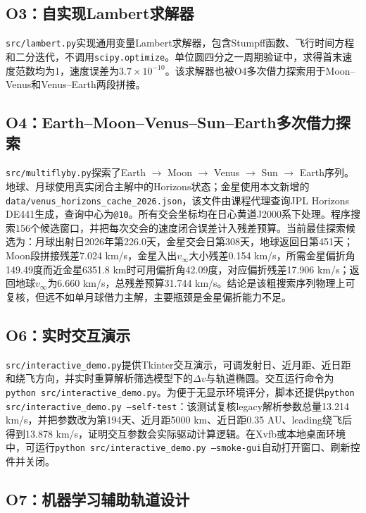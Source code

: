 \documentclass[11pt,a4paper]{ctexart}
\begin{document}
\subsection*{O3：自实现Lambert求解器}

\texttt{src/lambert.py}实现通用变量Lambert求解器，包含Stumpff函数、飞行时间方程和二分迭代，不调用\texttt{scipy.optimize}。单位圆四分之一周期验证中，求得首末速度范数均为1，速度误差为$3.7\times10^{-10}$。该求解器也被O4多次借力探索用于Moon--Venus和Venus--Earth两段拼接。

\subsection*{O4：Earth--Moon--Venus--Sun--Earth多次借力探索}

\texttt{src/multiflyby.py}探索了Earth $\to$ Moon $\to$ Venus $\to$ Sun $\to$ Earth序列。地球、月球使用真实闭合主解中的Horizons状态；金星使用本文新增的\texttt{data/venus\_horizons\_cache\_2026.json}，该文件由课程代理查询JPL Horizons DE441生成，查询中心为\texttt{@10}。所有交会坐标均在日心黄道J2000系下处理。程序搜索156个候选窗口，并把每次交会的速度闭合误差计入残差预算。当前最佳探索候选为：月球出射日2026年第226.0天，金星交会日第308天，地球返回日第451天；Moon段拼接残差7.024 km/s，金星入出$v_\infty$大小残差0.154 km/s，所需金星偏折角149.49度而近金星6351.8 km时可用偏折角42.09度，对应偏折残差17.906 km/s；返回地球$v_\infty$为6.660 km/s，总残差预算31.744 km/s。结论是该粗搜索序列物理上可复核，但远不如单月球借力主解，主要瓶颈是金星偏折能力不足。

\subsection*{O6：实时交互演示}

\texttt{src/interactive\_demo.py}提供Tkinter交互演示，可调发射日、近月距、近日距和绕飞方向，并实时重算解析筛选模型下的$\Delta v$与轨道椭圆。交互运行命令为\texttt{python src/interactive\_demo.py}。为便于无显示环境评分，脚本还提供\texttt{python src/interactive\_demo.py --self-test}：该测试复核legacy解析参数总量13.214 km/s，并把参数改为第194天、近月距5000 km、近日距0.35 AU、leading绕飞后得到13.878 km/s，证明交互参数会实际驱动计算逻辑。在Xvfb或本地桌面环境中，可运行\texttt{python src/interactive\_demo.py --smoke-gui}自动打开窗口、刷新控件并关闭。

\subsection*{O7：机器学习辅助轨道设计}
\end{document}
